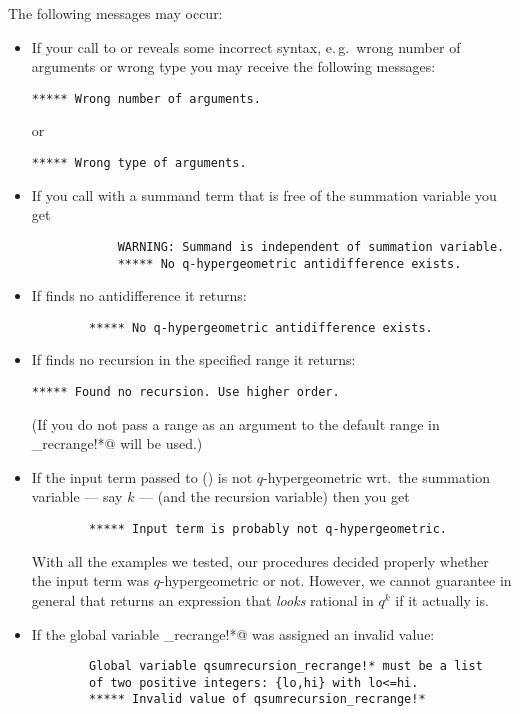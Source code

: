 The following messages may occur:
\begin{itemize}
%
	\item If your call to \verb@qgosper@ or \verb@qsumrecursion@
		reveals some incorrect syntax, e.\,g.\ wrong number of 
		arguments or wrong type you may receive the following messages:
		\begin{verbatim}***** Wrong number of arguments.\end{verbatim}
		or
		\begin{verbatim}***** Wrong type of arguments.\end{verbatim}
%
	\item If you call \verb@qgosper@ with a summand term that
		is free of the summation variable you get
		\begin{verbatim}
			WARNING: Summand is independent of summation variable.
			***** No q-hypergeometric antidifference exists.
		\end{verbatim}
%
%
	\item If \verb@qgosper@ finds no antidifference it returns:
		\begin{verbatim}
		***** No q-hypergeometric antidifference exists.
		\end{verbatim}
%
	\item If \verb@qsumrecursion@ finds no recursion in the specified
		range it returns:
		\begin{verbatim}***** Found no recursion. Use higher order.\end{verbatim}
		(If you do not pass a range as an argument to \verb@qsumrecursion@
		the default range in \verb@qsumrecursion_recrange!*@ will be used.)
%
	\item If the input term passed to \verb@qgosper@ 
		(\verb@qsumrecursion@) is not $q$-hyper\-geometric wrt.\ the 
		summation variable --- say $k$ --- (and the recursion variable) 
		then you get
		\begin{verbatim}
		***** Input term is probably not q-hypergeometric.
		\end{verbatim}
		With all the examples we tested, our procedures decided properly
		whether the input term was $q$-hypergeometric or not. However, we
		cannot guarantee in general that  returns
		an expression that {\sl looks} rational in $q^k$ if it actually is.
%
	\item If the global variable \verb@qsumrecursion_recrange!*@ was
		assigned an invalid value:
		\begin{verbatim}
		Global variable qsumrecursion_recrange!* must be a list
		of two positive integers: {lo,hi} with lo<=hi.
		***** Invalid value of qsumrecursion_recrange!* 
		\end{verbatim}
%
\end{itemize}

